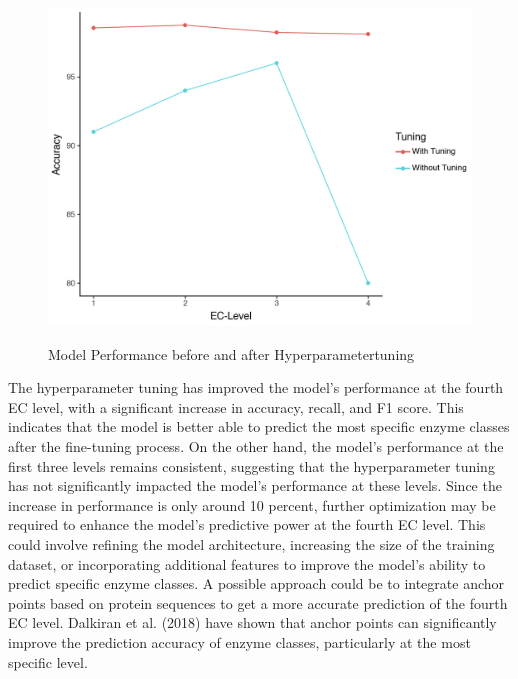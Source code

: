 \begin{figure}[hbt]
    \centering
    \begin{minipage}[t]{\textwidth}
    \caption{Model Performance before and after Hyperparametertuning}
    \includegraphics[width=1\textwidth]{img/model-performance-comparison.png}
    \label{fig:performance-comparison}
    \end{minipage}
\end{figure}

The hyperparameter tuning has improved the model's performance at the fourth EC level, with a significant increase in accuracy, recall, and F1 score. This indicates that the model is better able to predict the most specific enzyme classes after the fine-tuning process. On the other hand, the model's performance at the first three levels remains consistent, suggesting that the hyperparameter tuning has not significantly impacted the model's performance at these levels. Since the increase in performance is only around 10 percent, further optimization may be required to enhance the model's predictive power at the fourth EC level. This could involve refining the model architecture, increasing the size of the training dataset, or incorporating additional features to improve the model's ability to predict specific enzyme classes. A possible approach could be to integrate anchor points based on protein sequences to get a more accurate prediction of the fourth EC level. Dalkiran et al. (2018) have shown that anchor points can significantly improve the prediction accuracy of enzyme classes, particularly at the most specific level. \autocite{dalkiranECPredToolPrediction2018a}

